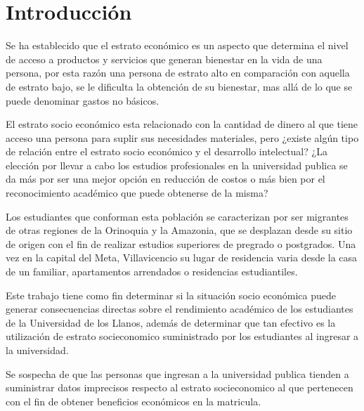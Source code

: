 \section{Introducción}

Se ha establecido que el estrato económico es un aspecto que determina el nivel de acceso a productos y servicios que generan bienestar en la vida de una persona, por esta razón una persona de estrato alto en comparación con aquella de estrato bajo, se le dificulta la obtención de su bienestar, mas allá de lo que se puede denominar gastos no básicos.

El estrato socio económico esta relacionado con la cantidad de dinero al que tiene acceso una persona para suplir sus necesidades materiales, pero ¿existe algún tipo de relación entre el estrato socio económico y el desarrollo intelectual? ¿La elección por llevar a cabo los estudios profesionales en la universidad publica se da más por ser una mejor opción en reducción de costos o más bien por el reconocimiento académico que puede obtenerse de la misma? 

Los estudiantes que conforman esta población se caracterizan por ser migrantes de otras regiones de la Orinoquia y la Amazonia, que se desplazan desde su sitio de origen con el fin de realizar estudios superiores de pregrado o postgrados. Una vez en la capital del Meta, Villavicencio su lugar de residencia varia desde la casa de un familiar, apartamentos arrendados o residencias estudiantiles.

Este trabajo tiene como fin determinar si la situación socio económica puede generar consecuencias directas sobre el rendimiento académico de los estudiantes de la Universidad de los Llanos, además de determinar que tan efectivo es la utilización de estrato socieconomico suministrado por los estudiantes al ingresar a la universidad.

Se sospecha de que las personas que ingresan a la universidad publica tienden a suministrar datos imprecisos respecto al estrato socieconomico al que pertenecen con el fin de obtener beneficios económicos en la matricula.

